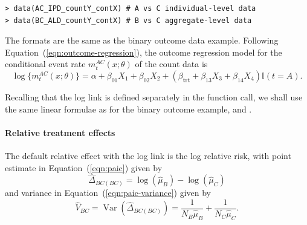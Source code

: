 \documentclass[article]{jss}
\begin{document}
\begin{verbatim}
> data(AC_IPD_countY_contX) # A vs C individual-level data
> data(BC_ALD_countY_contX) # B vs C aggregate-level data
\end{verbatim}






The formats are the same as the binary outcome data example.
Following Equation~(\ref{eqn:outcome-regression}), the outcome regression model for the conditional event rate $m_t^{AC}(x; \theta)$ of the count data is
$$
\log\{m_t^{AC}(x; \theta)\} = \alpha + \beta_{01} X_{1} + \beta_{02} X_{2} + (\beta_{\mathrm{trt}} + \beta_{13} X_{3} + \beta_{14} X_{4}) \mathbb{I}(t = A).
$$

Recalling that the log link is defined separately in the  function call, we shall use the same linear formulae as for the binary outcome example,  and .

\paragraph{Relative treatment effects}
The default relative effect with the log link is the log relative risk, with point estimate in Equation~(\ref{eqn:paic}) given by
$$
\widehat{\Delta}_{BC(BC)} = \log(\hat{\mu}_B) - \log(\hat{\mu}_C)
$$ 
and variance in Equation~(\ref{eqn:paic-variance}) given by
$$
\widehat{V}_{BC} = \operatorname{Var}(\widehat{\Delta}_{BC(BC)}) = \frac{1}{N_B \hat{\mu}_B} + \frac{1}{N_C \hat{\mu}_C}.
$$ 
\end{document}
